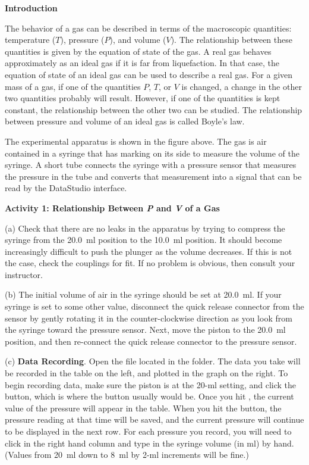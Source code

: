 \textbf{Introduction}

The behavior of a gas can be described in terms of the macroscopic quantities:
temperature ($T$), pressure ($P$), and volume ($V$). The relationship between these
quantities is given by the equation of state of the gas. A real gas behaves
approximately as an ideal gas if it is far from liquefaction. In that case,
the equation of state of an ideal gas can be used to describe a real gas. For
a given mass of a gas, if one of the quantities $P$, $T$, or $V$ is changed, a change
in the other two quantities probably will result. However, if one of the quantities
is kept constant, the relationship between the other two can be studied. The
relationship between pressure and volume of an ideal gas is called Boyle's law.

The experimental apparatus is shown in the figure above. The gas is air contained
in a syringe that has marking on its side to measure the volume of the syringe.
A short tube connects the syringe with a pressure sensor that measures the pressure
in the tube and converts that measurement into a signal that can be read by
the DataStudio interface.

\textbf{Activity 1: Relationship Between \textit{P} and \textit{V} of a Gas}

(a) Check that there are no leaks in the apparatus by trying to compress
the syringe from the 20.0~ml position to the 10.0~ml position. It should become
increasingly difficult to push the plunger as the volume decreases. If this
is not the case, check the couplings for fit. If no problem is obvious, then
consult your instructor. 
\vspace{20mm}

(b) The initial volume of air in the syringe should be set at 20.0~ml. If your
syringe is set to some other value, disconnect the quick release connector from
the sensor by gently rotating it in the counter-clockwise direction as you look
from the syringe toward the pressure sensor. Next, move the piston to the
20.0~ml position, and then re-connect the quick release connector to the pressure
sensor. 

(c) \textbf{Data Recording}. Open the file  located in the 
\filename{\coursefolder} folder.  The data you take will be recorded in the table on the left, and plotted in the graph on the right.  To begin recording data, make sure the piston is at the 20-ml setting, and click
the  button, which is where the  button usually would be. 
Once you hit , the current value of the pressure will appear in the table.  
When you hit the  button, the pressure reading at that time will be saved, and the current pressure will continue to be displayed in the next row.  For each pressure you record, you will need to click in the right hand column and type in the syringe volume (in ml) by hand.  (Values from 20~ml down to 8~ml by 2-ml increments will be fine.)


